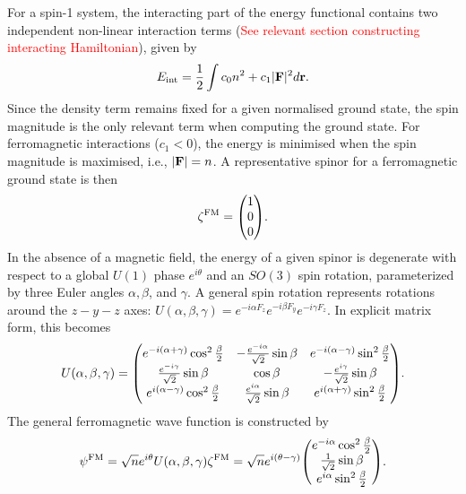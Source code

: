 For a spin-1 system, the interacting part of the energy functional contains
two independent non-linear interaction terms (\textcolor{red}{See relevant
section constructing interacting Hamiltonian}), given by
\begin{equation}
    E_\mathrm{int} = \frac{1}{2}\int c_0n^2+c_1|\vb{F}|^2 d\vb{r}.
\end{equation}
Since the density term remains fixed for a given normalised ground state, the
spin magnitude is the only relevant term when computing the ground state.
For ferromagnetic interactions (\(c_1 < 0 \)), the energy is minimised when
the spin magnitude is maximised, i.e., \(|\vb{F}| = n\).
A representative spinor for a ferromagnetic ground state is then
\begin{equation}
    \zeta^\mathrm{FM} = \mqty(1 \\ 0 \\ 0).
\end{equation}
In the absence of a magnetic field, the energy of a given spinor is degenerate
with respect to a global \(U(1)\) phase \(e^{i\theta}\) and an \(SO(3)\) spin
rotation, parameterized by three Euler angles \(\alpha, \beta \),
and \(\gamma \).
A general spin rotation represents rotations around the \(z-y-z\) axes:
\(U(\alpha, \beta, \gamma) = e^{-i\alpha F_z}e^{-i\beta F_y}e^{-i\gamma F_z}\).
In explicit matrix form, this becomes
\begin{equation}
    U(\alpha, \beta, \gamma) = \mqty(
        e^{-i(\alpha + \gamma)}\cos^2\frac{\beta}{2} &
        -\frac{e^{-i\alpha}}{\sqrt{2}}\sin\beta &
        e^{-i(\alpha - \gamma)}\sin^2\frac{\beta}{2} \\
        \frac{e^{-i\gamma}}{\sqrt{2}}\sin\beta &
        \cos\beta &
        -\frac{e^{i\gamma}}{\sqrt{2}}\sin\beta \\
        e^{i(\alpha - \gamma)}\cos^2\frac{\beta}{2} &
        \frac{e^{i\alpha}}{\sqrt{2}}\sin\beta &
        e^{i(\alpha + \gamma)}\sin^2\frac{\beta}{2}
    ).
\end{equation}
The general ferromagnetic wave function is constructed by
\begin{equation}\label{eq: FM-representative-spinor}
    \psi^\mathrm{FM} = 
    \sqrt{n}e^{i\theta}U(\alpha, \beta, \gamma)\zeta^\mathrm{FM} = 
    \sqrt{n}e^{i(\theta - \gamma)}\mqty(
        e^{-i\alpha}\cos^2\frac{\beta}{2} \\
        \frac{1}{\sqrt{2}}\sin\beta \\
        e^{i\alpha}\sin^2\frac{\beta}{2}
        ).
\end{equation}

